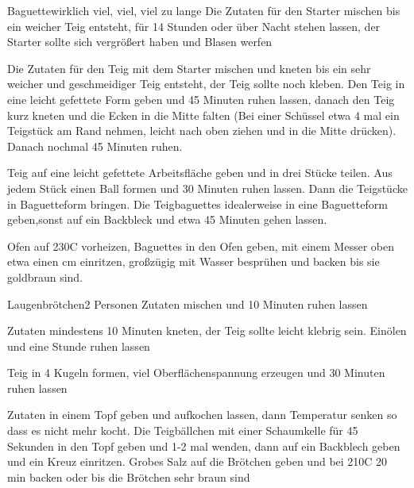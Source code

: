 


\begin{recipe}{Baguette}{}{wirklich viel, viel, viel zu lange}
Die Zutaten für den Starter mischen bis ein weicher Teig entsteht, für 14 Stunden oder über Nacht stehen lassen, der Starter sollte sich vergrößert haben und Blasen werfen

Die Zutaten für den Teig mit dem Starter mischen und kneten bis ein sehr weicher und geschmeidiger Teig entsteht, der Teig sollte noch kleben.
Den Teig in eine leicht gefettete Form geben und 45 Minuten ruhen lassen, danach den Teig kurz kneten und die Ecken in die Mitte falten (Bei einer Schüssel etwa 4 mal ein Teigstück am Rand nehmen, leicht nach oben ziehen und in die Mitte drücken). Danach nochmal 45 Minuten ruhen.

\ing[]{}{}
Teig auf eine leicht gefettete Arbeitsfläche geben und in drei Stücke teilen. Aus jedem Stück einen Ball formen und 30 Minuten ruhen lassen. Dann die Teigstücke in Baguetteform bringen.
Die Teigbaguettes idealerweise in eine Baguetteform geben,sonst auf ein Backbleck und etwa 45 Minuten gehen lassen. 

\ing[]{}{}
Ofen auf 230\0C vorheizen, Baguettes in den Ofen geben, mit einem Messer oben etwa einen cm einritzen, großzügig mit Wasser besprühen und backen bis sie goldbraun sind.
\end{recipe}



\begin{recipe}{Laugenbrötchen}{}{2 Personen}
Zutaten mischen und 10 Minuten ruhen lassen

Zutaten mindestens 10 Minuten kneten, der Teig sollte leicht klebrig sein.
Einölen und eine Stunde ruhen lassen

\ing[]{}{}
Teig in 4 Kugeln formen, viel Oberflächenspannung erzeugen und 30 Minuten ruhen lassen

Zutaten in einem Topf geben und aufkochen lassen, dann Temperatur senken so dass es nicht mehr kocht. Die Teigbällchen mit einer Schaumkelle für 45 Sekunden in den Topf geben und 1-2 mal wenden, dann auf ein Backblech geben und ein Kreuz einritzen.
Grobes Salz auf die Brötchen geben und bei 210\0C 20 min backen oder bis die Brötchen sehr braun sind 
\end{recipe}

